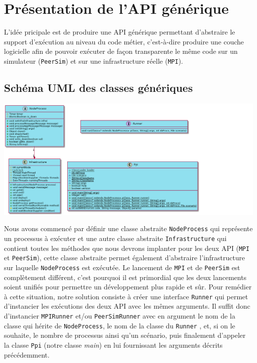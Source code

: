 \documentclass{article}
\begin{document}
			
				\section{Présentation de l'API générique}
				L'idée pricipale est de produire une API générique permettant d'abstraire le support d'exécution au niveau du code métier, c'est-à-dire produire une couche logicielle afin de pouvoir exécuter de façon transparente le même code sur un simulateur (\verb|PeerSim|) et sur une infrastructure réelle (\verb|MPI|).					
				\subsection{Schéma UML des classes génériques}
					\vspace{2mm}
					\hspace*{-1cm} \includegraphics[width=22cm]{uml/generique.png}
					
					\vspace{8mm}
					Nous avons commencé par définir une classe abstraite \verb|NodeProcess| qui représente un processus à exécuter et une autre classe abstraite \verb|Infrastructure| qui contient toutes les méthodes que nous devrons implanter pour les deux API (\verb|MPI| et \verb|PeerSim|), cette classe abstraite permet également d'abstraire l'infrastructure sur laquelle \verb|NodeProcess| est exécutée.
					\newline
					\newline
					Le lancement de \verb|MPI| et de \verb|PeerSim| est complètement différent, c’est pourquoi il est primordial que les deux lancements soient unifiés pour permettre un développement plus rapide et sûr. 
					\newline
					Pour remédier à cette situation, notre solution consiste à créer une interface \verb|Runner| qui permet d’instancier les exécutions des deux API avec les mêmes arguments. Il suffit donc d’instancier \verb|MPIRunner| et/ou \verb|PeerSimRunner| avec en argument le nom de la classe qui hérite de \verb|NodeProcess|, le nom de la classe du \verb|Runner| , et, si on le souhaite, le nombre de processus ainsi qu’un scénario, puis finalement d'appeler la classe \verb|Ppi| (notre classe \emph{main}) en lui fournissant les arguments décrits précédemment.
		
\end{document}
